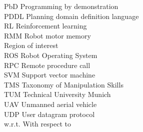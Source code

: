 \begin{tabbing}
PbD \> \> Programming by demonstration \\[1.1ex]
PDDL \> \> Planning domain definition language \\[1.1ex]
RL \> \> Reinforcement learning \\[1.1ex]
RMM \> \> Robot motor memory \\[1.1ex]
\roi{} \> \> Region of interest \\[1.1ex]
ROS \> \> Robot Operating System \\[1.1ex]
RPC \> \> Remote procedure call \\[1.1ex]
SVM \> \> Support vector machine \\[1.1ex]
TMS \> \> Taxonomy of Manipulation Skills \\[1.1ex]
TUM \> \> Technical University Munich \\[1.1ex]
UAV \> \> Unmanned aerial vehicle \\[1.1ex]
UDP \> \> User datagram protocol \\[1.1ex]
w.r.t. \> \> With respect to \\[1.1ex]
\end{tabbing}